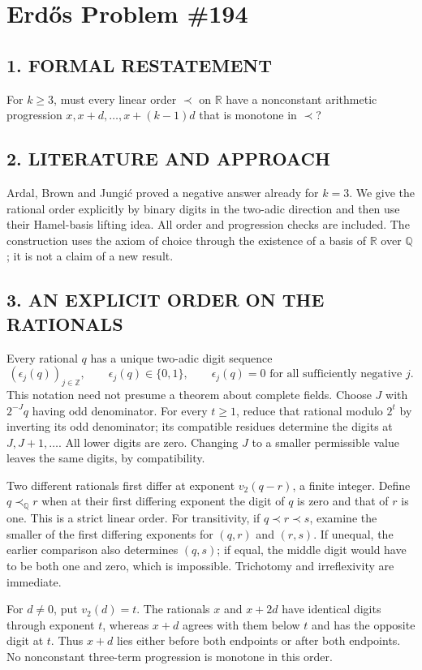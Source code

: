 \section{Erd\H{o}s Problem \#194}
\subsection*{1. FORMAL RESTATEMENT}
For $k\ge3$, must every linear order $\prec$ on $\mathbb R$ have a nonconstant arithmetic progression $x,x+d,\ldots,x+(k-1)d$ that is monotone in $\prec$?
\subsection*{2. LITERATURE AND APPROACH}
Ardal, Brown and Jungi\'c proved a negative answer already for $k=3$. We give the rational order explicitly by binary digits in the two-adic direction and then use their Hamel-basis lifting idea. All order and progression checks are included. The construction uses the axiom of choice through the existence of a basis of $\mathbb R$ over $\mathbb Q$; it is not a claim of a new result.
\subsection*{3. AN EXPLICIT ORDER ON THE RATIONALS}
Every rational $q$ has a unique two-adic digit sequence
\[
 (\epsilon_j(q))_{j\in\mathbb Z},\qquad \epsilon_j(q)\in\{0,1\},
 \qquad\epsilon_j(q)=0\text{ for all sufficiently negative }j.
\]
This notation need not presume a theorem about complete fields. Choose $J$ with $2^{-J}q$ having odd denominator. For every $t\ge1$, reduce that rational modulo $2^t$ by inverting its odd denominator; its compatible residues determine the digits at $J,J+1,\ldots$. All lower digits are zero. Changing $J$ to a smaller permissible value leaves the same digits, by compatibility.

Two different rationals first differ at exponent $v_2(q-r)$, a finite integer. Define $q\prec_{\mathbb Q}r$ when at their first differing exponent the digit of $q$ is zero and that of $r$ is one. This is a strict linear order. For transitivity, if $q\prec r\prec s$, examine the smaller of the first differing exponents for $(q,r)$ and $(r,s)$. If unequal, the earlier comparison also determines $(q,s)$; if equal, the middle digit would have to be both one and zero, which is impossible. Trichotomy and irreflexivity are immediate.

For $d\ne0$, put $v_2(d)=t$. The rationals $x$ and $x+2d$ have identical digits through exponent $t$, whereas $x+d$ agrees with them below $t$ and has the opposite digit at $t$. Thus $x+d$ lies either before both endpoints or after both endpoints. No nonconstant three-term progression is monotone in this order.
